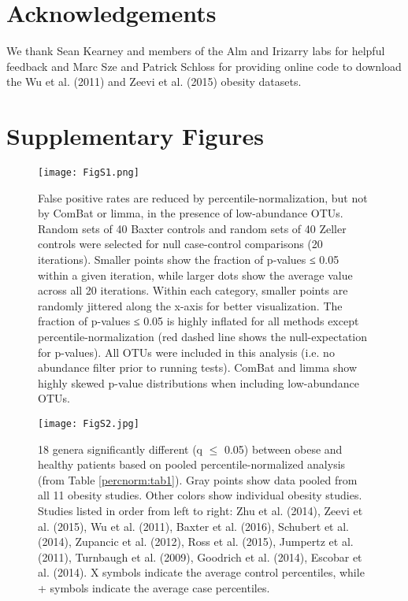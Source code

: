 \section{Acknowledgements}

We thank Sean Kearney and members of the Alm and Irizarry labs for helpful feedback and Marc Sze and Patrick Schloss for providing online code to download the Wu et al. (2011) and Zeevi et al. (2015) obesity datasets.

\section{Supplementary Figures}

\begin{figure}[h]
\begin{center}
    \texttt{[image: FigS1.png]}
    \caption{False positive rates are reduced by percentile-normalization, but not by ComBat or limma, in the presence of low-abundance OTUs. Random sets of 40 Baxter controls and random sets of 40 Zeller controls were selected for null case-control comparisons (20 iterations). Smaller points show the fraction of p-values ≤ 0.05 within a given iteration, while larger dots show the average value across all 20 iterations. Within each category, smaller points are randomly jittered along the x-axis for better visualization. The fraction of p-values ≤ 0.05 is highly inflated for all methods except percentile-normalization (red dashed line shows the null-expectation for p-values). All OTUs were included in this analysis (i.e. no abundance filter prior to running tests). ComBat and limma show highly skewed p-value distributions when including low-abundance OTUs.}\label{percnorm:figS1}
\end{center}
\end{figure}

\begin{figure}[h]
\begin{center}
    \texttt{[image: FigS2.jpg]}
    \caption{18 genera significantly different (q $\leq$ 0.05) between obese and healthy patients based on pooled percentile-normalized analysis (from Table \ref{percnorm:tab1}). Gray points show data pooled from all 11 obesity studies. Other colors show individual obesity studies. Studies listed in order from left to right: Zhu et al. (2014), Zeevi et al. (2015), Wu et al. (2011), Baxter et al. (2016), Schubert et al. (2014), Zupancic et al. (2012), Ross et al. (2015), Jumpertz et al. (2011), Turnbaugh et al. (2009), Goodrich et al. (2014), Escobar et al. (2014). X symbols indicate the average control percentiles, while + symbols indicate the average case percentiles.}\label{percnorm:figS2}
\end{center}
\end{figure}

